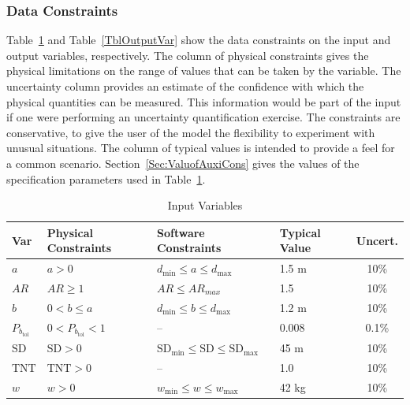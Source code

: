 \documentclass[12pt]{article}
\begin{document}
\subsubsection{Data Constraints} \label{sec_DataConstraints}

Table~\ref{TblInputVar} and Table~\ref{TblOutputVar} show the data constraints on the input and output variables, respectively.  The
column of physical constraints gives the physical limitations on the range of
values that can be taken by the variable. The uncertainty column provides an estimate of the confidence
with which the physical quantities can be measured.  This information would be
part of the input if one were performing an uncertainty quantification exercise. The constraints are conservative, to
give the user of the model the flexibility to experiment with unusual
situations.  The column of typical values is intended to provide a feel for a
common scenario.
Section~\ref{Sec:ValuofAuxiCons} gives the values of the specification parameters used
in Table~\ref{TblInputVar}.

\begin{table}[!h]
\caption{Input Variables} \label{TblInputVar}
\renewcommand{\arraystretch}{1.2}
\begin{tabular}{l l l l c} 
\toprule
\textbf{Var} & \textbf{Physical Constraints} & \textbf{Software Constraints} & \textbf{Typical Value} & \textbf{Uncert.} \\
\midrule 
$a$&$a > 0 $ & $d_{\text{min}} \leq a \leq d_{\text{max}}$ 
                           & 1.5 \si[per-mode=symbol] {\metre}& 10\%\\

$AR$& $AR \geq 1$ & $AR \leq AR_{max}$ & 1.5 & 10\%\\
                           
$b$&$0 < b \leq a$ & $d_{\text{min}} \leq b \leq d_{\text{max}}$ 
                           & 1.2 \si[per-mode=symbol]{\metre}& 10\%\\
 
$P_{b_{\text{tol}}}$& $0 < P_{b_{\text{tol}}} < 1$& --& 0.008 &0.1\%\\

$\text{SD}$&$\text{SD}>0$&$\text{SD}_{\text{min}} \leq \text{SD} \leq \text{SD}_{\text{max}}$&45
\si[per-mode=symbol]{\meter}&10\%\\

$\text{TNT}$&$\text{TNT}>0$&--&1.0&10\%\\


$w$&$w > 0$ & $w_{\text{min}} \le w \le w_{\text{max}}$&42 \si[per-mode=symbol]{\kilo\gram}&10\%\\

\bottomrule
\end{tabular}
\end{table}
\end{document}
